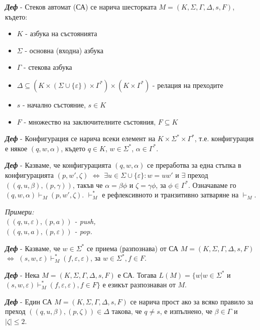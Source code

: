 \documentclass[fleqn,12pt]{article}
\begin{document}
\noindent\textit{\textbf{Деф}} - Стеков автомат (СА) се нарича шесторката $M = (K, \Sigma, \Gamma, \Delta, s, F)$, където:
\begin{itemize}
    \item $K$ - азбука на състоянията
    \item $\Sigma$ - основна (входна) азбука
    \item $\Gamma$ - стекова азбука
    \item $\Delta \subseteq (K \times (\Sigma \cup \{\varepsilon\}) \times \Gamma^*) \times (K \times \Gamma^*)$ - релация на преходите
    \item $s$ - начално състояние, $s \in K$
    \item $F$ - множество на заключителните състояния, $F \subseteq K$
\end{itemize}

\noindent\textit{\textbf{Деф}} - Конфигурация се нарича всеки елемент на $K \times \Sigma^* \times \Gamma^*$, т.е. конфигурация е някое $(q, w, \alpha)$, където $q \in K$, $w \in \Sigma^*$, $\alpha \in \Gamma^*$.

\noindent\textit{\textbf{Деф}} - Казваме, че конфигурацията $(q, w, \alpha)$ се преработва за една стъпка в конфигурацията $(p, w', \zeta)$ $\iff$ $\exists u \in \Sigma \cup \{\varepsilon\}: w=uw'$ и $\exists$ преход $((q, u, \beta), (p, \gamma))$, 
такъв че $\alpha = \beta\phi$ и $\zeta = \gamma\phi$, за $\phi \in \Gamma^*$. Означаваме го $(q, w, \alpha) \vdash_M (p, w', \zeta)$. $\vdash_M^*$ е рефлексивното и транзитивно затваряне на $\vdash_M$.

\noindent\textit{Примери:\\
$((q, u, \varepsilon), (p, a))$ - push, \\
$((q, u, a), (p, \varepsilon))$ - pop.
}

\noindent\textit{\textbf{Деф}} - Казваме, че $w \in \Sigma^*$ се приема (разпознава) от СА $M = (K, \Sigma, \Gamma, \Delta, s, F)$ $\iff$ $(s, w, \varepsilon) \vdash_M^* (f, \varepsilon, \varepsilon)$, за $w \in \Sigma^*, f \in F$.

\noindent\textit{\textbf{Деф}} - Нека $M = (K, \Sigma, \Gamma, \Delta, s, F)$ е СА. Тогава $L(M) = \{w | w \in \Sigma^*$ и $ (s, w, \varepsilon) \vdash_M^* (f, \varepsilon, \varepsilon), f \in F\}$ е езикът разпознаван от $M$.

\noindent\textit{\textbf{Деф}} - Един СА $M = (K, \Sigma, \Gamma, \Delta, s, F)$ се нарича прост ако за всяко правило за преход $((q, u, \beta), (p, \zeta)) \in \Delta$ такова, че $q \neq s$, е изпълнено, че $\beta \in \Gamma$ и $|\zeta| \leq 2$.
\end{document}
